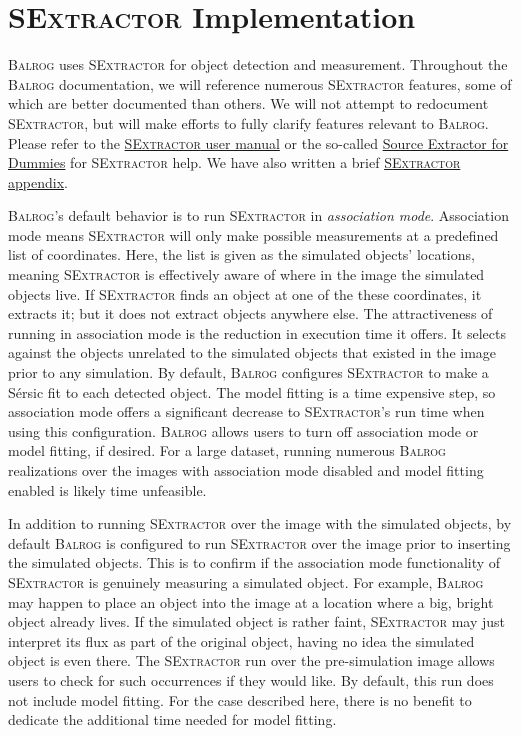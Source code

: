 \documentclass[11pt]{book}
\newcommand{\balrog}{\textsc{Balrog}}
\newcommand{\sex}{\textsc{SExtractor}}
\newcommand{\sersic}{S\'{e}rsic}
\begin{document}
\section{\sex{} Implementation}
\label{sec:processing}

\balrog{} uses \sex{} for object detection and measurement.
Throughout the \balrog{} documentation, we will reference numerous \sex{} features, 
some of which are better documented than others.
We will not attempt to redocument \sex{}, but will make efforts to fully clarify features relevant to \balrog{}.
Please refer to the \href{https://www.astromatic.net/pubsvn/software/sextractor/trunk/doc/sextractor.pdf}{\sex{} user manual} 
or the so-called \href{http://astroa.physics.metu.edu.tr/MANUALS/sextractor/Guide2source\_extractor.pdf}{Source Extractor for Dummies}
for \sex{} help.
We have also written a brief \hyperref[sec:quicksex]{\sex{} appendix}.

\hypertarget{hyper:assoc}{}
\balrog{}'s default behavior is to run \sex{} in \emph{association mode}.
Association mode means \sex{} will only make possible measurements at a predefined list of coordinates.
Here, the list is given as the simulated objects' locations,
meaning \sex{} is effectively aware of where in the image the simulated objects live.
If \sex{} finds an object at one of the these coordinates, it extracts it; but it does not extract objects anywhere else.
The attractiveness of running in association mode is the reduction in execution time it offers.
It  selects against the objects unrelated to the simulated objects that existed in the image prior to any simulation.
By default, \balrog{} configures \sex{} to make a \sersic{} fit to each detected object.
The model fitting is a time expensive step, so association mode offers a significant decrease
to \sex{}'s run time  when using this configuration.
\balrog{} allows users to turn off association mode or model fitting, if desired.
For a large dataset, running numerous \balrog{} realizations over the images
with association mode disabled and model fitting enabled is likely time unfeasible.

In addition to running \sex{} over the image with the simulated objects,
by default \balrog{} is configured to run \sex{} over the image prior to inserting the simulated objects.
This is to confirm if the association mode functionality of \sex{} is genuinely measuring a simulated object.
For example, \balrog{} may happen to place an object into the image at a location where a big, bright object already lives.
If the simulated object is rather faint, \sex{} may just interpret its flux as part of the original object, having no
idea the simulated object is even there. The \sex{} run over the pre-simulation image allows users to check
for such occurrences if they would like. By default, this run does not include model fitting.
For the case described here, there is no benefit to dedicate the additional time needed for model fitting.
\end{document}
